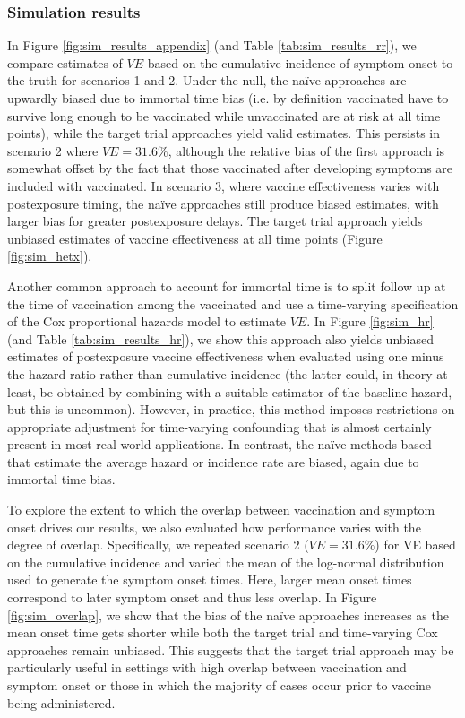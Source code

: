 \begin{appendices}
\begin{refsection}
    \subsubsection*{Simulation results}
    In Figure \ref{fig:sim_results_appendix} (and Table \ref{tab:sim_results_rr}), we compare estimates of $VE$ based on the cumulative incidence of symptom onset to the truth for scenarios 1 and 2. Under the null, the na\"{i}ve approaches are upwardly biased due to immortal time bias (i.e. by definition vaccinated have to survive long enough to be vaccinated while unvaccinated are at risk at all time points), while the target trial approaches yield valid estimates. This persists in scenario 2 where $VE = 31.6\%$, although the relative bias of the first approach is somewhat offset by the fact that those vaccinated after developing symptoms are included with vaccinated. In scenario 3, where vaccine effectiveness varies with postexposure timing, the na\"{i}ve approaches still produce biased estimates, with larger bias for greater postexposure delays. The target trial approach yields unbiased estimates of vaccine effectiveness at all time points (Figure \ref{fig:sim_hetx}). 

    Another common approach to account for immortal time is to split follow up at the time of vaccination among the vaccinated and use a time-varying specification of the Cox proportional hazards model to estimate $VE$. In Figure \ref{fig:sim_hr} (and Table \ref{tab:sim_results_hr}), we show this approach also yields unbiased estimates of postexposure vaccine effectiveness when evaluated using one minus the hazard ratio rather than cumulative incidence (the latter could, in theory at least, be obtained by combining with a suitable estimator of the baseline hazard, but this is uncommon). However, in practice, this method imposes restrictions on appropriate adjustment for time-varying confounding that is almost certainly present in most real world applications. In contrast, the na\"{i}ve methods based that estimate the average hazard or incidence rate are biased, again due to immortal time bias. 

    To explore the extent to which the overlap between vaccination and symptom onset drives our results, we also evaluated how performance varies with the degree of overlap. Specifically, we repeated scenario 2 ($VE = 31.6\%$) for VE based on the cumulative incidence and varied the mean of the log-normal distribution used to generate the symptom onset times. Here, larger mean onset times correspond to later symptom onset and thus less overlap. In Figure \ref{fig:sim_overlap}, we show that the bias of the na\"{i}ve approaches increases as the mean onset time gets shorter while both the target trial and time-varying Cox approaches remain unbiased. This suggests that the target trial approach may be particularly useful in settings with high overlap between vaccination and symptom onset or those in which the majority of cases occur prior to vaccine being administered.


\end{refsection}
\end{appendices}
